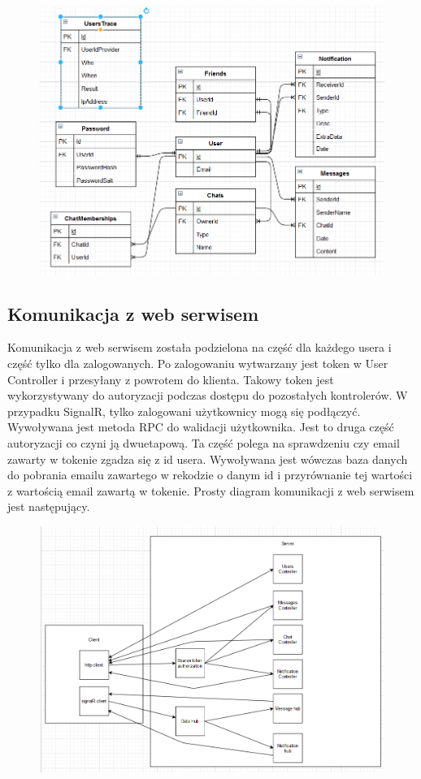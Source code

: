 \documentclass[12pt,a4paper]{article}
\begin{document}
\begin{figure}[ht!]
	\centering
	\includegraphics[width=0.7\linewidth]{diagrambazydanycj}
	\caption{}
	\label{fig:diagrambazydanycj}
\end{figure}


\subsection{Komunikacja z web serwisem} %
Komunikacja z web serwisem została podzielona na część dla każdego usera i część tylko dla zalogowanych.
Po zalogowaniu wytwarzany jest token w User Controller i przesyłany z powrotem do klienta. Takowy token jest wykorzystywany do autoryzacji podczas dostępu do pozostałych kontrolerów. W przypadku SignalR, tylko zalogowani użytkownicy mogą się podłączyć. Wywoływana jest metoda RPC do walidacji użytkownika. Jest to druga część autoryzacji co czyni ją dwuetapową. Ta część polega na sprawdzeniu czy email zawarty w tokenie zgadza się z id usera. Wywoływana jest wówczas baza danych do pobrania emailu zawartego w rekodzie o danym id i przyrównanie tej wartości z wartością email zawartą w tokenie. Prosty diagram komunikacji z web serwisem jest następujący.

\begin{figure}[h]
	\centering
	\includegraphics[width=0.7\linewidth]{komunikacjazwebserwisem}
	\caption{}
	\label{fig:komunikacjazwebserwisem}
\end{figure}
\end{document}
